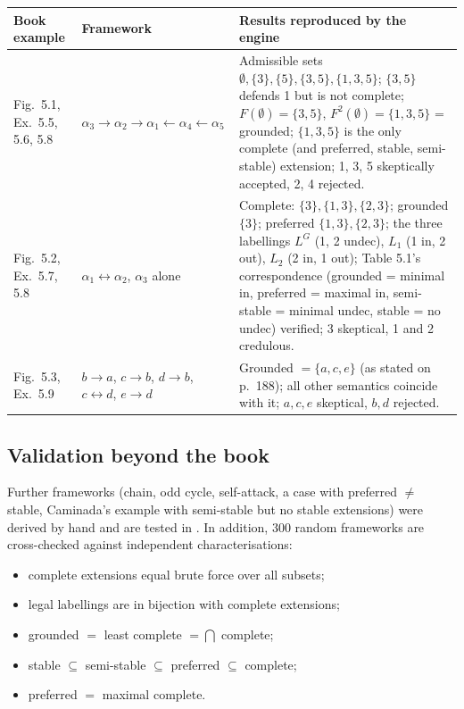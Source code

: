 \documentclass[11pt,a4paper]{article}
\newcommand{\code}[1]{\texttt{\detokenize{#1}}}
\begin{document}
\begin{center}
\small
\begin{tabularx}{\textwidth}{@{}p{2.6cm}p{3.3cm}X@{}}
\toprule
Book example & Framework & Results reproduced by the engine\\
\midrule
Fig.\ 5.1, Ex.\ 5.5, 5.6, 5.8 &
$\alpha_3\!\to\!\alpha_2\!\to\!\alpha_1\!\leftarrow\!\alpha_4\!\leftarrow\!\alpha_5$ &
Admissible sets $\emptyset,\{3\},\{5\},\{3,5\},\{1,3,5\}$; $\{3,5\}$ defends 1 but is not complete;
$F(\emptyset)=\{3,5\}$, $F^2(\emptyset)=\{1,3,5\}$ = grounded; $\{1,3,5\}$ is the only complete (and preferred, stable,
semi-stable) extension; 1, 3, 5 skeptically accepted, 2, 4 rejected.\\[0.4em]
Fig.\ 5.2, Ex.\ 5.7, 5.8 &
$\alpha_1\leftrightarrow\alpha_2$, $\alpha_3$ alone &
Complete: $\{3\},\{1,3\},\{2,3\}$; grounded $\{3\}$; preferred $\{1,3\},\{2,3\}$; the three labellings $L^G$ (1, 2 undec),
$L_1$ (1 in, 2 out), $L_2$ (2 in, 1 out); Table 5.1's correspondence (grounded = minimal in, preferred = maximal in,
semi-stable = minimal undec, stable = no undec) verified; 3 skeptical, 1 and 2 credulous.\\[0.4em]
Fig.\ 5.3, Ex.\ 5.9 &
$b\!\to\!a$, $c\!\to\!b$, $d\!\to\!b$, $c\!\leftrightarrow\!d$, $e\!\to\!d$ &
Grounded $=\{a,c,e\}$ (as stated on p.~188); all other semantics coincide with it; $a,c,e$ skeptical, $b,d$ rejected.\\
\bottomrule
\end{tabularx}
\end{center}

\subsection{Validation beyond the book}

Further frameworks (chain, odd cycle, self-attack, a case with preferred $\ne$ stable, Caminada's example with semi-stable
but no stable extensions) were derived by hand and are tested in \code{test_engine.py}. In addition, 300 random frameworks
are cross-checked against independent characterisations:

\begin{itemize}
\item complete extensions equal brute force over all subsets;
\item legal labellings are in bijection with complete extensions;
\item grounded $=$ least complete $=\bigcap$ complete;
\item stable $\subseteq$ semi-stable $\subseteq$ preferred $\subseteq$ complete;
\item preferred $=$ maximal complete.
\end{itemize}
\end{document}

